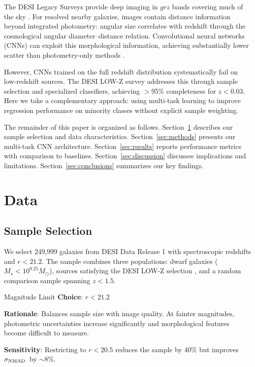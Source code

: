\documentclass[linenumbers,twocolumn]{aastex7}
\newcommand{\sigmaNMAD}{\ensuremath{\sigma_{\rm NMAD}}}
\begin{document}
The DESI Legacy Surveys provide deep imaging in $grz$ bands covering much of 
the sky \citep{Dey2019}. For resolved nearby galaxies, images contain distance 
information beyond integrated photometry: angular size correlates with redshift 
through the cosmological angular diameter--distance relation. Convolutional 
neural networks (CNNs) can exploit this morphological information, achieving 
substantially lower scatter than photometry-only methods 
\citep{Pasquet2019,Treyer2023}.

However, CNNs trained on the full redshift distribution systematically fail 
on low-redshift sources. The DESI LOW-Z survey \citep{DarraghFord2023} 
addresses this through sample selection and specialized classifiers, achieving 
$>$95\% completeness for $z < 0.03$. Here we take a complementary approach: 
using multi-task learning to improve regression performance on minority classes 
without explicit sample weighting.

The remainder of this paper is organized as follows. Section~\ref{sec:data} 
describes our sample selection and data characteristics. Section~\ref{sec:methods} 
presents our multi-task CNN architecture. Section~\ref{sec:results} reports 
performance metrics with comparison to baselines. Section~\ref{sec:discussion} 
discusses implications and limitations. Section~\ref{sec:conclusions} summarizes 
our key findings.

\section{Data}
\label{sec:data}

\subsection{Sample Selection}

We select 249,999 galaxies from DESI Data Release 1 with spectroscopic redshifts 
and $r < 21.2$. The sample combines three populations: dwarf galaxies 
($M_\star < 10^{9.25} M_\odot$), sources satisfying the DESI LOW-Z selection 
\citep{DarraghFord2023}, and a random comparison sample spanning $z < 1.5$.

\begin{assumption}{Magnitude Limit}
\textbf{Choice}: $r < 21.2$

\textbf{Rationale}: Balances sample size with image quality. At fainter 
magnitudes, photometric uncertainties increase significantly and morphological 
features become difficult to measure.

\textbf{Sensitivity}: Restricting to $r < 20.5$ reduces the sample by 40\% 
but improves \sigmaNMAD\ by $\sim$8\%.
\end{assumption}
\end{document}
